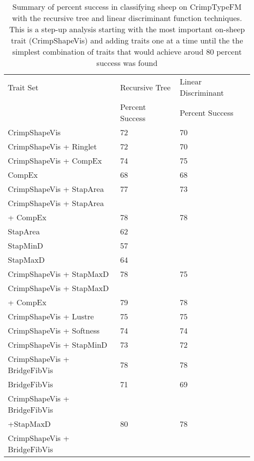 %

\begin{table}[htp]
\centering
\caption{Summary of percent success in classifying sheep on CrimpTypeFM with the recursive tree and linear discriminant function techniques. This is a step-up analysis starting with the most important on-sheep trait (CrimpShapeVis) and adding traits one at a time until the the simplest combination of traits that would achieve aroud 80 percent success was found}
\label{tab:success}
\vspace{0.1in}
\begin{tabular}{|p{2.2in}|p{1.2in}|p{1.2in}|}  \hline
  Trait Set & Recursive Tree & Linear Discriminant \\
         & Percent Success & Percent Success  \\ \hline
  CrimpShapeVis               & 72 & 70 \\
  CrimpShapeVis + Ringlet     & 72 & 70 \\
  CrimpShapeVis + CompEx      & 74 & 75 \\
  CompEx                      & 68 & 68 \\
  CrimpShapeVis + StapArea    & 77 & 73 \\
  CrimpShapeVis + StapArea    & & \\
  + CompEx                    & 78 & 78 \\
  StapArea                    & 62 &    \\
  StapMinD                    & 57 &    \\
  StapMaxD                    & 64 &    \\
  CrimpShapeVis + StapMaxD    & 78 & 75 \\
  CrimpShapeVis + StapMaxD    & & \\
  + CompEx                    & 79 & 78 \\
  CrimpShapeVis + Lustre      & 75 & 75 \\
  CrimpShapeVis + Softness    & 74 & 74 \\
  CrimpShapeVis + StapMinD    & 73 & 72 \\
  CrimpShapeVis + BridgeFibVis & 78 & 78 \\
  BridgeFibVis                 & 71 & 69 \\
  CrimpShapeVis + BridgeFibVis & & \\
  +StapMaxD                    & 80 & 78 \\
  CrimpShapeVis + BridgeFibVis & & \\

\end{tabular}
\end{table}
